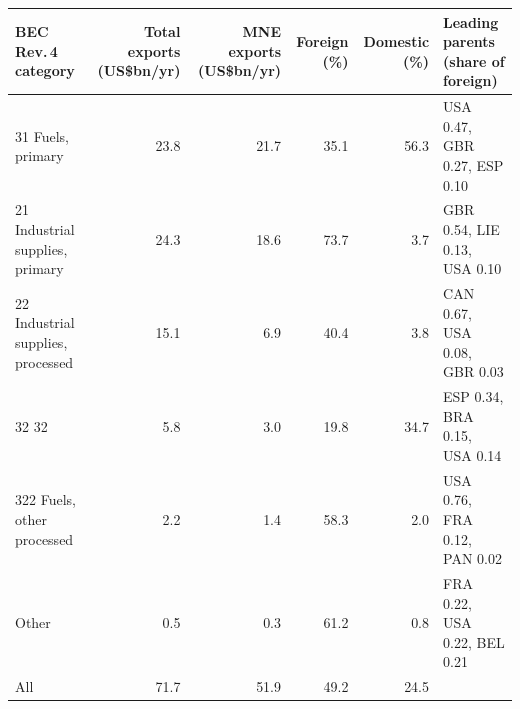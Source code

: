 \begin{tabular}{@{}l r r r r l@{}}
\toprule
BEC Rev.\,4 category & Total exports (US\$bn/yr) & MNE exports (US\$bn/yr) & Foreign (\%) & Domestic (\%) & Leading parents (share of foreign) \\
\midrule
31 Fuels, primary & 23.8 & 21.7 & 35.1 & 56.3 & USA 0.47, GBR 0.27, ESP 0.10 \\
21 Industrial supplies, primary & 24.3 & 18.6 & 73.7 & 3.7 & GBR 0.54, LIE 0.13, USA 0.10 \\
22 Industrial supplies, processed & 15.1 & 6.9 & 40.4 & 3.8 & CAN 0.67, USA 0.08, GBR 0.03 \\
32 32 & 5.8 & 3.0 & 19.8 & 34.7 & ESP 0.34, BRA 0.15, USA 0.14 \\
322 Fuels, other processed & 2.2 & 1.4 & 58.3 & 2.0 & USA 0.76, FRA 0.12, PAN 0.02 \\
Other & 0.5 & 0.3 & 61.2 & 0.8 & FRA 0.22, USA 0.22, BEL 0.21 \\
\midrule
All & 71.7 & 51.9 & 49.2 & 24.5 & \\
\bottomrule
\end{tabular}
